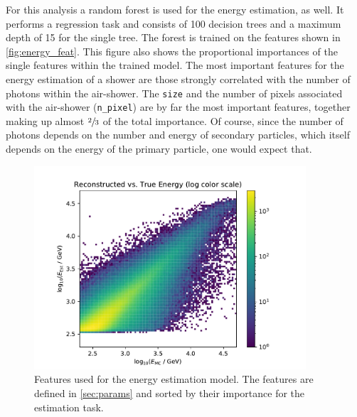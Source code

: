 For this analysis a random forest is used for the energy estimation, as well.
It performs a regression task and consists of \num{100} decision trees and a
maximum depth of \num{15} for the single tree. The forest is trained on the
features shown in \autoref{fig:energy_feat}. This figure also shows the
proportional importances of the single features within the trained model. The
most important features for the energy estimation of a shower are those
strongly correlated with the number of photons within the air-shower. The
\texttt{size} and the number of pixels associated with the air-shower
(\texttt{n\_pixel}) are by far the most important features, together making up
almost $\sfrac{2}{3}$ of the total importance. Of course, since the number of
photons depends on the number and energy of secondary particles, which itself
depends on the energy of the primary particle, one would expect that.
%
\begin{figure}
  \centering
  \includegraphics[width=0.9\textwidth, page=4]{Plots/results/DBSCAN/energy_performance.pdf}
  \caption{Features used for the energy estimation model. The features are defined in \autoref{sec:params} and sorted by their importance for the estimation task.}
  \label{fig:energy_feat}
\end{figure}
%

